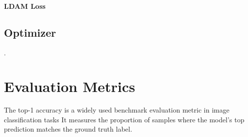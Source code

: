 \paragraph{LDAM Loss}

\subsection{Optimizer}
 \cite{menon2021longtaillearninglogitadjustment,loshchilov2018fixing}. 

\section{Evaluation Metrics}
The top-1 accuracy is a widely used benchmark evaluation metric in image classification tasks \cite{zhang2023deep}  It measures the proportion of samples where the model's top prediction matches the ground truth label.

